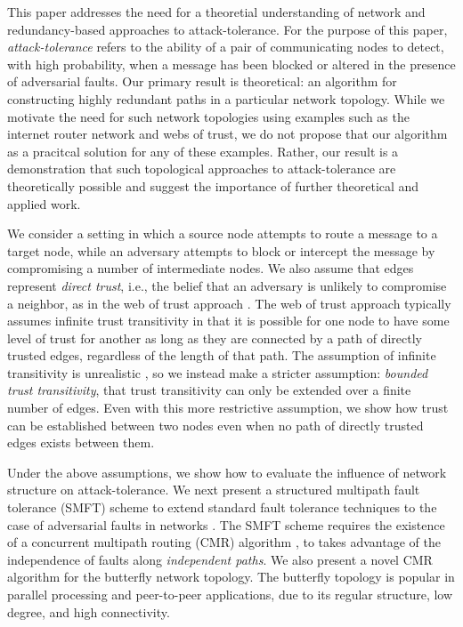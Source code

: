 \documentclass[10pt,letterpaper]{article}
\begin{document}
This paper addresses the need for a theoretial understanding of network and
redundancy-based approaches to attack-tolerance.
For the purpose of this paper, {\em attack-tolerance} refers to the ability of a pair of
communicating nodes to detect,
with high probability,
when a message has been blocked or altered
in the presence of adversarial faults.
Our primary result is theoretical: an algorithm for constructing highly redundant
paths in a particular network topology.
While we motivate the need for such network topologies using examples such as
the internet router network and webs of trust,
we do not propose that our algorithm as a pracitcal solution for any of these
examples.
Rather, our result is a demonstration that such topological approaches to
attack-tolerance are theoretically possible and suggest the importance
of further theoretical and applied work.

We consider a setting in which a source node attempts to route a message
to a target node, while an adversary attempts to block or intercept the message
by compromising a number of intermediate nodes.
We also assume that edges represent {\em direct trust},
i.e., the belief that an adversary is unlikely to compromise a neighbor,
as in the web of trust approach
\cite{zimmermann_official_1995,richters_trust_2011}.
The web of trust approach typically assumes infinite trust transitivity in that
it is possible for one node to have some level of trust for another as long
as they are connected by a path of directly trusted edges,
regardless of the length of that path.
The assumption of infinite transitivity is unrealistic
\cite{christianson_why_1997},
so we instead make a stricter assumption: {\em bounded trust transitivity},
that trust transitivity can only be extended over a finite number of edges.
Even with this more restrictive assumption, we show how trust can be established
between two nodes even when no path of directly trusted edges exists between them.

Under the above assumptions,
we show how to evaluate the influence of network structure
on attack-tolerance.
We next present a structured multipath fault tolerance (SMFT) scheme to extend
standard fault tolerance techniques to the case of adversarial faults in
networks
\cite{avizienis_basic_2004, von_neumann_probabilistic_1956}.
The SMFT scheme requires the existence of a
concurrent multipath routing (CMR) algorithm
\cite{zin_survey_2015, qadir_exploiting_2015, khiani_comparative_2013},
to takes advantage of the independence of faults
along {\em independent paths}.
We also present a novel CMR algorithm for the butterfly network topology.
The butterfly topology is popular in parallel processing
\cite{kshemkalyani_distributed_2008} and
peer-to-peer \cite{lua_survey_2005, korzun_structured_2013}
applications, due to its regular structure, low degree, and high connectivity.
\end{document}
